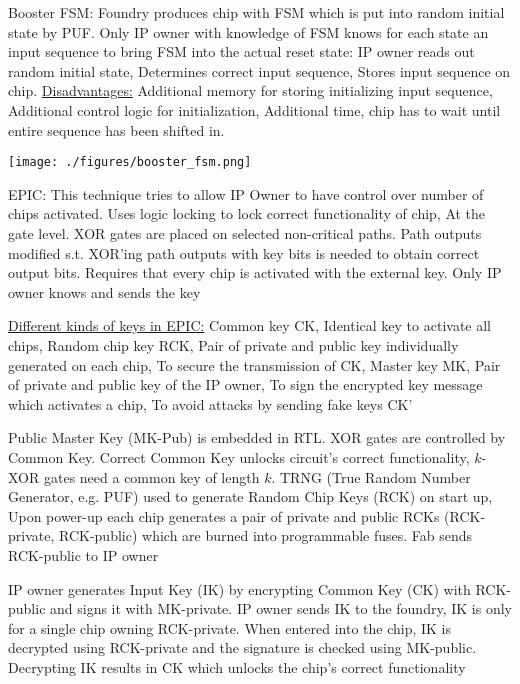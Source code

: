 \documentclass[landscape, a4paper]{article}
\begin{document}
\begin{minipage}[t]{0.2\linewidth}
\begin{betterlist}
\begin{betterlist}
			\begin{betterlist}
				\item \alert{Booster FSM:} Foundry produces chip with FSM which is put into random initial state by PUF. Only IP owner with knowledge of FSM knows for each state an input sequence to bring FSM into the actual \alert{reset state}: IP owner reads out random initial state, Determines correct input sequence, Stores input sequence on chip. \underline{Disadvantages:} Additional memory for storing initializing input sequence, Additional control logic for initialization, Additional time, chip has to wait until entire sequence has been shifted in.

				\texttt{[image: ./figures/booster\_fsm.png]}
				\item \alert{EPIC:} This technique tries to allow IP Owner to have control over number of chips activated. Uses logic locking to lock correct functionality of chip, At the gate level. XOR gates are placed on selected non-critical paths. Path outputs modified s.t. XOR’ing path outputs with key bits is needed to obtain correct output bits. Requires that every chip is activated with the external key. Only IP owner knows and sends the key
				\begin{betterlist}
					\item \underline{Different kinds of keys in EPIC:} \alert{Common key CK}, Identical key to activate all chips, \alert{Random chip key RCK}, Pair of private and public key individually generated on each chip, To secure the transmission of CK, \alert{Master key MK}, Pair of private and public key of the IP owner, To sign the encrypted key message which activates a chip, To avoid attacks by sending fake keys CK'
					\item Public Master Key (MK-Pub) is embedded in RTL. XOR gates are controlled by Common Key. Correct Common Key unlocks circuit's correct functionality, $k$-XOR gates need a common key of length $k$. TRNG (True Random Number Generator, e.g. PUF) used to generate Random Chip Keys (RCK) on start up, Upon power-up each chip generates a pair of private and public RCKs (RCK-private, RCK-public) which are burned into programmable fuses. Fab sends RCK-public to IP owner
					\item IP owner generates Input Key (IK) by encrypting Common Key (CK) with RCK-public and signs it with MK-private. IP owner sends IK to the foundry, IK is only for a single chip owning RCK-private. When entered into the chip, IK is decrypted using RCK-private and the signature is checked using MK-public. Decrypting IK results in CK which unlocks the chip’s correct functionality
				\end{betterlist}
			\end{betterlist}


\end{betterlist}
\end{betterlist}
\end{minipage}
\end{document}
